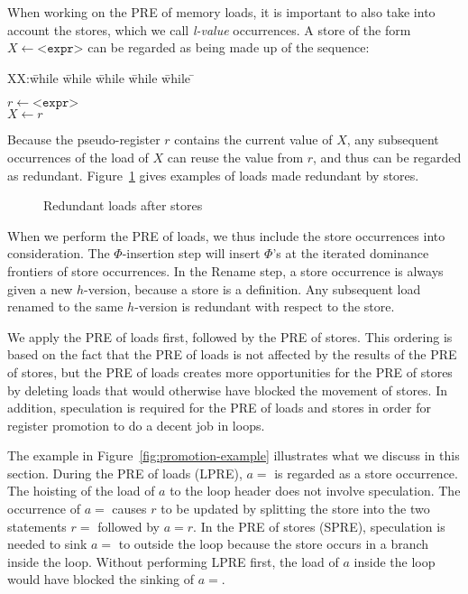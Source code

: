 When working on the PRE of memory loads, it is important to also take into account the stores, which we call \emph{l-value} occurrences. 
A store of the form $X \leftarrow \texttt{<expr>}$ can be regarded as being made up of the sequence:
\begin{tabbing}
XX:\= while \= while \= while \= while \= while \= \kill

\> \> $r \leftarrow \texttt{<expr>}$ \\
\> \> $X \leftarrow r$ \\
\end{tabbing}
Because the pseudo-register $r$ contains the current value of $X$, any subsequent occurrences of the load of $X$ can reuse the value from $r$, and thus can be regarded as redundant. 
Figure~\ref{fig:lval-occur} gives examples of loads made redundant by stores.

\begin{figure}
\centering
\hfill
{}
\caption{Redundant loads after stores}
\label{fig:lval-occur}
\end{figure}

When we perform the PRE of loads, we thus include the store occurrences into consideration. 
The $\Phi$-insertion step will insert $\Phi$'s at the iterated dominance frontiers of store occurrences. 
In the Rename step, a store occurrence is always given a new $h$-version, because a store is a definition. 
Any subsequent load renamed to the same $h$-version is redundant with respect to the store.

We apply the PRE of loads first, followed by the PRE of stores. 
This ordering is based on the fact that the PRE of loads is not affected by the results of the PRE of stores, but the PRE of loads creates more opportunities for the PRE of stores by deleting loads that would otherwise have blocked the movement of stores. 
In addition, speculation is required for the PRE of loads and stores in order for register promotion to do a decent job in loops.

The example in Figure~\ref{fig:promotion-example} illustrates what we discuss in this section. 
During the PRE of loads (LPRE), $a =$ is regarded as a store occurrence. 
The hoisting of the load of $a$ to the loop header does not involve speculation. 
The occurrence of $a =$ causes $r$ to be updated by splitting the store into the two statements $r =$ followed by $a = r$. 
In the PRE of stores (SPRE), speculation is needed to sink $a =$ to outside the loop because the store occurs in a branch inside the loop. 
Without performing LPRE first, the load of $a$ inside the loop would have blocked the sinking of $a =$.

